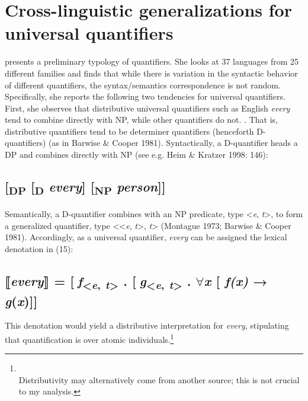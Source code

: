 \documentclass[output=paper]{langsci/langscibook}
\begin{document}
\section{Cross-linguistic generalizations for universal quantifiers}

\citet{Matthewson2013} presents a preliminary typology of quantifiers. She looks at 37 languages from 25 different families and finds that while there is variation in the syntactic behavior of different quantifiers, the syntax/semantics correspondence is not random. Specifically, she reports the following two tendencies for universal quantifiers. First, she observes that distributive universal quantifiers such as English \textit{every} tend to {\textquotedbl}combine directly with NP, while other quantifiers do not.{\textquotedbl} \citep[36]{Matthewson2013}. That is, distributive quantifiers tend to be determiner quantifiers (henceforth D-quantifiers) (as in Barwise \& Cooper 1981). Syntactically, a D-quantifier heads a DP and combines directly with NP (see e.g. Heim \& Kratzer 1998: 146): 

\subsection{      [\textsubscript{DP} [\textsubscript{D} \textit{every}] [\textsubscript{NP} \textit{person}]]}

Semantically, a D-quantifier combines with an NP predicate, type <\textit{e}, \textit{t}>, to form a generalized quantifier, type <<\textit{e}, \textit{t}>, \textit{t}> (Montague 1973; Barwise \& Cooper 1981). Accordingly, as a universal quantifier, \textit{every} can be assigned the lexical denotation in (15):

\subsection{      ⟦\textit{every}⟧ = [\textit{f}\textsubscript{<}\textit{\textsubscript{e}}\textsubscript{,}\textit{\textsubscript{ t}}\textsubscript{>} . [\textit{g}\textsubscript{<}\textit{\textsubscript{e}}\textsubscript{,}\textit{\textsubscript{ t}}\textsubscript{>} . ${\forall}$\textit{x} [ \textit{f(x)} → \textit{g}(\textit{x})]]}

This denotation would yield a distributive interpretation for \textit{every}, stipulating that quantification is over atomic individuals.\footnote{\\
 Distributivity may alternatively come from another source; this is not crucial to my analysis.}
\end{document}
